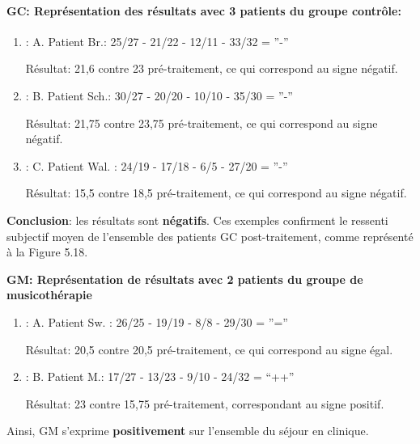 \paragraph{ GC: Représentation des résultats avec 3 patients du groupe contrôle:}

\begin{enumerate}
\item : A. Patient Br.:  25/27 - 21/22 - 12/11 - 33/32 =  ''-''

          Résultat: 21,6 contre 23 pré-traitement,  ce qui
        correspond au signe négatif.
      \item : B. Patient Sch.: 30/27 - 20/20 -  10/10 - 35/30 = ''-''

         Résultat: 21,75 contre 23,75 pré-traitement, ce qui
        correspond au signe négatif.

 		\item :  C. Patient Wal. : 24/19 -  17/18 - 6/5 -
                  27/20 =  ''-''

                  Résultat: 15,5 contre 18,5 pré-traitement, ce qui
        correspond au signe négatif.
 	\end{enumerate}


       \textbf{ Conclusion}: les résultats sont \textbf{négatifs}.
        Ces exemples confirment
        le ressenti subjectif moyen de l'ensemble des patients
        GC post-traitement, comme représenté à la Figure 5.18.

       \textbf{ GM: Représentation de résultats avec 2 patients du groupe de musicothérapie}

\begin{enumerate}
 		\item : A. Patient Sw. : 26/25 - 19/19 - 8/8 - 29/30 =  ''=''



  Résultat: 20,5 contre 20,5 pré-traitement, ce qui
        correspond au signe égal.



 		\item : B. Patient M.: 17/27 - 13/23 -  9/10 - 24/32 = ``++''

              Résultat: 23 contre 15,75 pré-traitement, correspondant
              au signe positif.
            \end{enumerate}

                 Ainsi,  GM s'exprime
                 \textbf{positivement }
                 sur l'ensemble du séjour en clinique.



